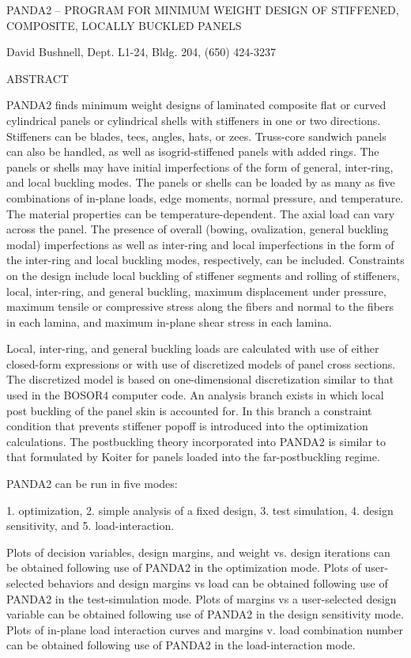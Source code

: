      PANDA2 -- PROGRAM FOR MINIMUM WEIGHT DESIGN
               OF STIFFENED, COMPOSITE, LOCALLY BUCKLED PANELS

    David Bushnell, Dept. L1-24, Bldg. 204, (650) 424-3237


                       ABSTRACT

PANDA2 finds minimum weight designs of laminated composite flat or curved
cylindrical panels  or cylindrical shells with stiffeners in one or two
directions. Stiffeners can be blades, tees, angles, hats, or zees. Truss-core
sandwich panels can also be handled, as well as isogrid-stiffened panels
with added rings. The panels or shells may have initial imperfections of
the form of general, inter-ring, and local buckling modes. The panels or
shells can be loaded by as many as five combinations of in-plane loads,
edge moments, normal pressure, and temperature.  The material properties
can be temperature-dependent. The axial load can vary across the panel.
The presence of overall (bowing, ovalization, general buckling modal)
imperfections as well as inter-ring and local imperfections in the form of
the inter-ring and local buckling modes, respectively, can be included.
Constraints on the design include local buckling of stiffener segments and
rolling of stiffeners, local, inter-ring, and general buckling, maximum
displacement under pressure, maximum tensile or compressive stress along
the fibers and normal to the fibers in each lamina, and maximum in-plane
shear stress in each lamina. 

Local, inter-ring, and general buckling loads are calculated with use of
either closed-form expressions or with use of discretized models of panel
cross sections. The discretized model is based on one-dimensional
discretization similar to that used in the BOSOR4 computer code. An
analysis branch exists in which local post buckling of the panel skin is
accounted for. In this branch a constraint condition that prevents
stiffener popoff is introduced into the optimization calculations. The
postbuckling theory incorporated into PANDA2 is similar to that formulated
by Koiter for panels loaded into the far-postbuckling regime. 


PANDA2 can be run in five modes: 

 1. optimization,
 2. simple analysis of a fixed design,
 3. test simulation,
 4. design sensitivity, and
 5. load-interaction.

Plots of decision variables, design margins, and weight vs. design
iterations can be obtained following use of PANDA2 in the optimization
mode. Plots of user-selected behaviors and design margins vs load can be
obtained following use of PANDA2 in the test-simulation mode. Plots of
margins vs a user-selected design variable can be obtained following use
of PANDA2 in the design sensitivity mode. Plots of in-plane load
interaction curves and margins v. load combination number can be obtained
following use of PANDA2 in the load-interaction mode. 

